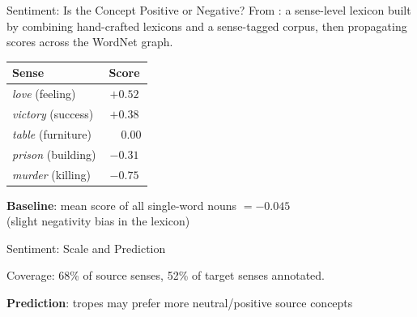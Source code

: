\documentclass[xetex]{beamer}
\begin{document}
\begin{frame}{Sentiment: Is the Concept Positive or Negative?}
From \citet{Bond:Choo:2022}: a sense-level
lexicon built by combining hand-crafted
lexicons and a sense-tagged corpus, then
propagating scores across the WordNet graph.

\begin{center}
  
\begin{tabular}{lc}
\toprule
Sense & Score \\
\midrule
\textit{love} (feeling) & $+0.52$ \\
\textit{victory} (success) & $+0.38$ \\
\textit{table} (furniture) & $\phantom{+}0.00$ \\
\textit{prison} (building) & $-0.31$ \\
\textit{murder} (killing) & $-0.75$ \\
\bottomrule
\end{tabular}
\end{center}

\medskip
\textbf{Baseline}: mean score of all single-word nouns $= -0.045$\\
{\small (slight negativity bias in the lexicon)}
\end{frame}

\begin{frame}{Sentiment: Scale and Prediction}
\begin{center}
\end{center}

\medskip
Coverage: 68\% of source senses, 52\% of target senses annotated.

\medskip
\textbf{Prediction}: tropes may prefer more neutral/positive source concepts
\end{frame}
\end{document}
